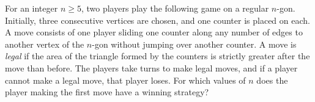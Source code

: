 For an integer $n \geq 5$, two players play the following game on a regular $n$-gon. Initially, three consecutive vertices are chosen, and one counter is placed on each. A move consists of one player sliding one counter along any number of edges to another vertex of the $n$-gon without jumping over another counter. A move is \emph{legal} if the area of the triangle formed by the counters is strictly greater after the move than before. The players take turns to make legal moves, and if a player cannot make a legal move, that player loses. For which values of $n$ does the player making the first move have a winning strategy?